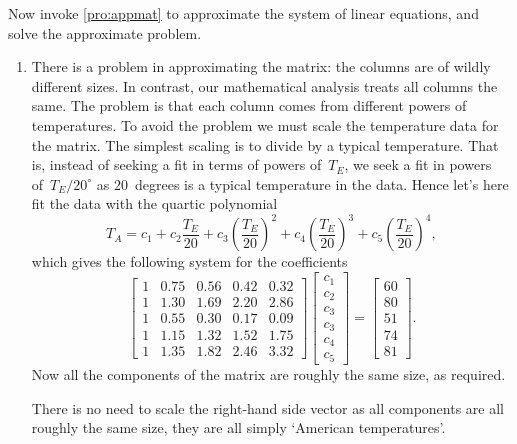 \begin{example}
\begin{solution}
Now invoke \autoref{pro:appmat} to approximate the system of linear equations, and solve the approximate problem.
\begin{enumerate}
\item
There is a problem in approximating the matrix: the columns are of wildly different sizes.  
In contrast, our mathematical analysis treats all columns the same.  
The problem is that each column comes from different powers of temperatures.  
To avoid the problem we must scale the temperature data for the matrix.  
The simplest scaling is to divide by a typical temperature.
That is, instead of seeking a fit in terms of powers of~\(T_E\), we seek a fit in powers of~\(T_E/20^\circ\) as \(20\)~degrees is a typical temperature in the data.
Hence let's here fit the data with the quartic polynomial
\begin{equation*}
T_A=c_1+c_2\frac{T_E}{20} +c_3\left(\frac{T_E}{20}\right)^2+c_4\left(\frac{T_E}{20}\right)^3+c_5\left(\frac{T_E}{20}\right)^4,
\end{equation*}
which gives the following system for the coefficients \twodp
\begin{equation*}
\begin{bmatrix} 1&0.75&0.56&0.42&0.32
\\1&1.30&1.69&2.20&2.86
\\1&0.55&0.30&0.17&0.09
\\1&1.15&1.32&1.52&1.75
\\1&1.35&1.82&2.46&3.32 \end{bmatrix}
\begin{bmatrix} c_1\\c_2\\c_3\\c_3\\c_4\\c_5 \end{bmatrix}
=\begin{bmatrix} 60\\80\\51\\74\\81 \end{bmatrix}.
\end{equation*}
Now all the components of the matrix are roughly the same size, as required.

There is no need to scale the right-hand side vector as all components are all roughly the same size, they are all simply `American temperatures'. 


\end{enumerate}
\end{solution}
\end{example}

